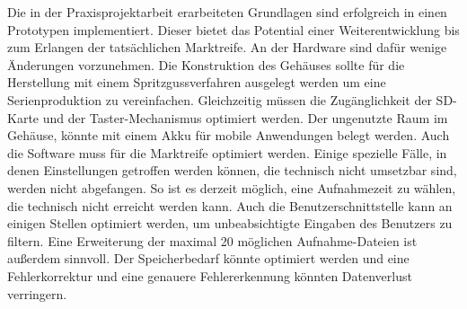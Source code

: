 Die in der Praxisprojektarbeit erarbeiteten Grundlagen sind erfolgreich in einen Prototypen implementiert. Dieser bietet das Potential einer Weiterentwicklung bis zum Erlangen der tatsächlichen Marktreife. An der Hardware sind dafür wenige Änderungen vorzunehmen. Die Konstruktion des Gehäuses sollte für die Herstellung mit einem Spritzgussverfahren ausgelegt werden um eine Serienproduktion zu vereinfachen. Gleichzeitig müssen die Zugänglichkeit der SD-Karte und der Taster-Mechanismus optimiert werden. Der ungenutzte Raum im Gehäuse, könnte mit einem Akku für mobile Anwendungen belegt werden. Auch die Software muss für die Marktreife optimiert werden. Einige spezielle Fälle, in denen Einstellungen getroffen werden können, die technisch nicht umsetzbar sind, werden nicht abgefangen. So ist es derzeit möglich, eine Aufnahmezeit zu wählen, die technisch nicht erreicht werden kann. Auch die Benutzerschnittstelle kann an einigen Stellen optimiert werden, um unbeabsichtigte Eingaben des Benutzers zu filtern. Eine Erweiterung der maximal 20 möglichen Aufnahme-Dateien ist außerdem sinnvoll. Der Speicherbedarf könnte optimiert werden und eine Fehlerkorrektur und eine genauere Fehlererkennung könnten Datenverlust verringern.

